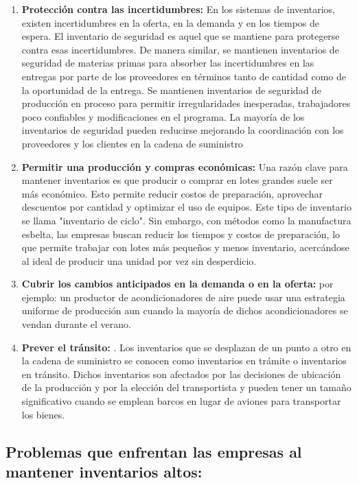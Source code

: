\documentclass[a4paper,oneside,11pt]{article}
\begin{document}
\begin{enumerate}
    \item \textbf{Protección contra las incertidumbres:} En los sistemas de inventarios, existen incertidumbres en la oferta, en la demanda y en los tiempos de espera. El inventario de seguridad es aquel que se mantiene para protegerse contra esas incertidumbres. De manera similar, se mantienen inventarios de seguridad de materias primas para absorber las incertidumbres en las entregas por parte de los proveedores en términos tanto de cantidad como de la oportunidad de la entrega. Se mantienen inventarios de seguridad de producción en proceso para permitir irregularidades inesperadas, trabajadores poco confiables y modificaciones en el programa. La mayoría de los inventarios de seguridad pueden reducirse mejorando la coordinación con los proveedores y los clientes en la cadena de suministro
    \item \textbf{Permitir una producción y compras económicas:} Una razón clave para mantener inventarios es que producir o comprar en lotes grandes suele ser más económico. Esto permite reducir costos de preparación, aprovechar descuentos por cantidad y optimizar el uso de equipos. Este tipo de inventario se llama "inventario de ciclo". Sin embargo, con métodos como la manufactura esbelta, las empresas buscan reducir los tiempos y costos de preparación, lo que permite trabajar con lotes más pequeños y menos inventario, acercándose al ideal de producir una unidad por vez sin desperdicio.
    \item \textbf{Cubrir los cambios anticipados en la demanda o en la oferta:} por ejemplo: un productor de acondicionadores de aire puede usar una estrategia uniforme de producción aun cuando la mayoría de dichos acondicionadores se vendan durante el verano.
    \item \textbf{Prever el tránsito:} . Los inventarios que se desplazan de un punto a otro en la cadena de suministro se conocen como inventarios en trámite o inventarios en tránsito. Dichos inventarios son afectados por las decisiones de ubicación de la producción y por la elección del transportista y pueden tener un tamaño significativo cuando se emplean barcos en lugar de aviones para transportar los bienes.
\end{enumerate}

\subsection{Problemas que enfrentan las empresas al mantener inventarios altos:}
\end{document}
